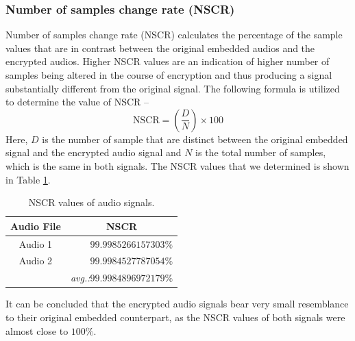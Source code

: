 \documentclass[a4paper]{cas-sc}
\begin{document}
\subsubsection{Number of samples change rate (NSCR)}
Number of samples change rate (NSCR) calculates the percentage of the sample values that are in contrast between the original embedded audios and the encrypted audios. Higher NSCR values are an indication of higher number of samples being altered in the course of encryption and thus producing a signal substantially different from the original signal. The following formula is utilized to determine the value of NSCR --
\begin{equation}
    \text{NSCR}=\left(\frac{D}{N}\right)\times100
\end{equation}
Here, $D$ is the number of sample that are distinct between the original embedded signal and the encrypted audio signal and $N$ is the total number of samples, which is the same in both signals. The NSCR values that we determined is shown in Table \ref{table:nscr}.
\begin{table}[pos=h]
    \begin{center}
        \caption{NSCR values of audio signals.}
        \begin{tabular}{cr}
            \hline
            Audio File & \multicolumn{1}{c}{NSCR}                    \\ \hline
            Audio 1    & $99.9985266157303\%$                        \\ \hdashline
            Audio 2    & $99.9984527787054\%$                        \\ \hline
                       & \textit{avg.:}$\mathbf{99.9984896972179\%}$
        \end{tabular}
        \label{table:nscr}
    \end{center}
\end{table}

It can be concluded that the encrypted audio signals bear very small resemblance to their original embedded counterpart, as the NSCR values of both signals were almost close to $100\%$.
\end{document}
